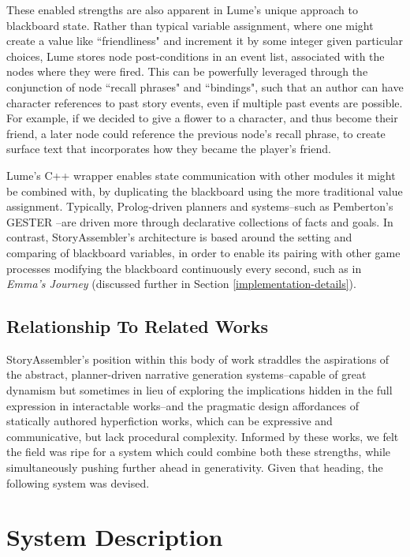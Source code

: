 These enabled strengths are also apparent in Lume's unique approach to blackboard state. Rather than typical variable assignment, where one might create a value like ``friendliness" and increment it by some integer given particular choices, Lume stores node post-conditions in an event list, associated with the nodes where they were fired. This can be powerfully leveraged through the conjunction of node ``recall phrases" and ``bindings", such that an author can have character references to past story events, even if multiple past events are possible. For example, if we decided to give a flower to a character, and thus become their friend, a later node could reference the previous node's recall phrase, to create surface text that incorporates how they became the player's friend.

Lume's C++ wrapper enables state communication with other modules it might be combined with, by duplicating the blackboard using the more traditional value assignment. Typically, Prolog-driven planners and systems--such as Pemberton's GESTER \cite{gester}--are driven more through declarative collections of facts and goals. In contrast, StoryAssembler's architecture is based around the setting and comparing of blackboard variables, in order to enable its pairing with other game processes modifying the blackboard continuously every second, such as in \textit{Emma's Journey} (discussed further in Section \ref{implementation-details}).

\subsection{Relationship To Related Works}

StoryAssembler's position within this body of work straddles the aspirations of the abstract, planner-driven narrative generation systems--capable of great dynamism but sometimes in lieu of exploring the implications hidden in the full expression in interactable works--and the pragmatic design affordances of statically authored hyperfiction works, which can be expressive and communicative, but lack procedural complexity. Informed by these works, we felt the field was ripe for a system which could combine both these strengths, while simultaneously pushing further ahead in generativity. Given that heading, the following system was devised.

\section{System Description}
\label{system-description}

